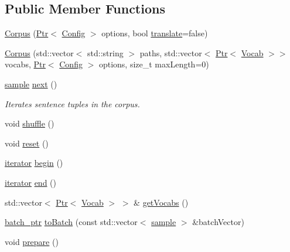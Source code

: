 \subsection*{Public Member Functions}
\begin{DoxyCompactItemize}
\item 
\hyperlink{classmarian_1_1data_1_1Corpus_a42b8f8778f2a08c1c9f8e9fd45465a82}{Corpus} (\hyperlink{namespacemarian_ad1a373be43a00ef9ce35666145137b08}{Ptr}$<$ \hyperlink{classmarian_1_1Config}{Config} $>$ options, bool \hyperlink{amunmt_8cpp_a86ebd9110196f3b5328ad3c3d31cd007}{translate}=false)
\item 
\hyperlink{classmarian_1_1data_1_1Corpus_a70a6fa97c673146090a075c0e54c894b}{Corpus} (std\+::vector$<$ std\+::string $>$ paths, std\+::vector$<$ \hyperlink{namespacemarian_ad1a373be43a00ef9ce35666145137b08}{Ptr}$<$ \hyperlink{classmarian_1_1Vocab}{Vocab} $>$$>$ vocabs, \hyperlink{namespacemarian_ad1a373be43a00ef9ce35666145137b08}{Ptr}$<$ \hyperlink{classmarian_1_1Config}{Config} $>$ options, size\+\_\+t max\+Length=0)
\item 
\hyperlink{classmarian_1_1data_1_1DatasetBase_afc6678b770b6da1edabe3ed6d29b4bdd}{sample} \hyperlink{classmarian_1_1data_1_1Corpus_a383139a28eb51cc4140e3c97fd0ecebe}{next} ()
\begin{DoxyCompactList}\small\item\em Iterates sentence tuples in the corpus. \end{DoxyCompactList}\item 
void \hyperlink{classmarian_1_1data_1_1Corpus_acd46d4ac2667b7490d14543c96362928}{shuffle} ()
\item 
void \hyperlink{classmarian_1_1data_1_1Corpus_a145f4b656cfb4036f1ded4df925b418b}{reset} ()
\item 
\hyperlink{classmarian_1_1data_1_1DatasetBase_a5ab99390e2f5f8c7eab612977ae64f38}{iterator} \hyperlink{classmarian_1_1data_1_1Corpus_a054a1ee5ac98508eba55365e32e234f6}{begin} ()
\item 
\hyperlink{classmarian_1_1data_1_1DatasetBase_a5ab99390e2f5f8c7eab612977ae64f38}{iterator} \hyperlink{classmarian_1_1data_1_1Corpus_aaf3680a2d946cd804efc978c7f526881}{end} ()
\item 
std\+::vector$<$ \hyperlink{namespacemarian_ad1a373be43a00ef9ce35666145137b08}{Ptr}$<$ \hyperlink{classmarian_1_1Vocab}{Vocab} $>$ $>$ \& \hyperlink{classmarian_1_1data_1_1Corpus_ab05ca913f9db36d2f9b47128f3986d7b}{get\+Vocabs} ()
\item 
\hyperlink{classmarian_1_1data_1_1DatasetBase_a4cb5e9051a072fcc61ed4638862f01f5}{batch\+\_\+ptr} \hyperlink{classmarian_1_1data_1_1Corpus_ac822ed674cbb116ad7a47f6742fab7ac}{to\+Batch} (const std\+::vector$<$ \hyperlink{classmarian_1_1data_1_1DatasetBase_afc6678b770b6da1edabe3ed6d29b4bdd}{sample} $>$ \&batch\+Vector)
\item 
void \hyperlink{classmarian_1_1data_1_1Corpus_a6c6058eb862c1129038523f11e0326c2}{prepare} ()
\end{DoxyCompactItemize}
